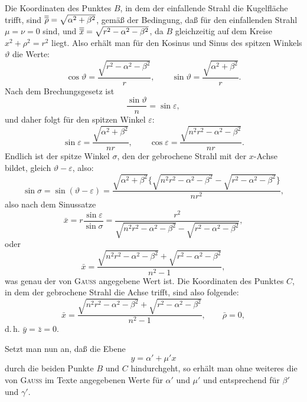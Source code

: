 \noindent\hspace*{\parindent}Die Koordinaten des Punktes $B$, in dem der einfallende Strahl die Kugelfläche trifft, sind $\overline{\overline{\rho}}=\sqrt{\alpha^2+\beta^2}$, gemäß der Bedingung, daß für den einfallenden Strahl $\mu=\nu=0$ sind, und $\overline{\overline{x}}=\sqrt{r^2-\alpha^2-\beta^2}$, da $B$ gleichzeitig auf dem Kreise $x^2+\rho^2=r^2$ liegt. Also erhält man für den Kosinus und Sinus des spitzen Winkels $\vartheta$ die Werte:
\[
\cos\vartheta=\frac{\sqrt{r^2-\alpha^2-\beta^2}}r,\qquad
\sin\vartheta=\frac{\sqrt{\alpha^2+\beta^2}}r.
\]
\noindent Nach dem Brechungsgesetz ist
\[
\frac{\sin\vartheta}n=\sin\varepsilon,
\]
\noindent und daher folgt für den spitzen Winkel $\varepsilon$:
\[
\sin\varepsilon=\frac{\sqrt{\alpha^2+\beta^2}}{nr},\qquad
\cos\varepsilon=\frac{\sqrt{n^2r^2-\alpha^2-\beta^2}}{nr}.
\]
\clearpage{}
\noindent Endlich ist der spitze Winkel $\sigma$, den der gebrochene Strahl mit der $x$-Achse bildet, gleich $\vartheta-\varepsilon$, also:
\[
\sin\sigma=\sin(\vartheta-\varepsilon)
=\frac{\sqrt{\alpha^2+\beta^2}\{\sqrt{n^2r^2-\alpha^2-\beta^2}-\sqrt{r^2-\alpha^2-\beta^2}\}}{nr^2},
\]
\noindent also nach dem Sinussatze
\[
\bar x=r\frac{\sin\varepsilon}{\sin\sigma}
=\frac{r^2}{\sqrt{n^2r^2-\alpha^2-\beta^2}-\sqrt{r^2-\alpha^2-\beta^2}},
\]
\noindent oder
\[
\bar x=\frac{\sqrt{n^2r^2-\alpha^2-\beta^2}+\sqrt{r^2-\alpha^2-\beta^2}}{n^2-1},
\]
\noindent was genau der von \textsc{Gauss} angegebene Wert ist. Die Koordinaten des Punktes $C$, in dem der gebrochene Strahl die Achse trifft, sind also folgende:
\[
\bar x=\frac{\sqrt{n^2r^2-\alpha^2-\beta^2}+\sqrt{r^2-\alpha^2-\beta^2}}{n^2-1},\qquad \bar\rho=0,
\]
\noindent d.\,h. $\bar y=\bar z=0$.

Setzt man nun an, daß die Ebene
\[
y=\alpha'+\mu'x
\]
\noindent durch die beiden Punkte $B$ und $C$ hindurchgeht, so erhält man ohne weiteres die von \textsc{Gauss} im Texte angegebenen Werte für $\alpha'$ und $\mu'$ und entsprechend für $\beta'$ und $\gamma'$.

